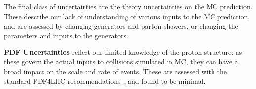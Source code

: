 	The final class of uncertainties are the theory uncertainties on the MC prediction. These describe our lack of understanding of various inputs to the MC prediction, and are assessed by changing generators and parton showers, or changing the parameters and inputs to the generators.


	\textbf{PDF Uncertainties} reflect our limited knowledge of the proton structure: as these govern the actual inputs to collisions simulated in MC, they can have a broad impact on the scale and rate of events. These are assessed with the standard PDF4LHC recommendations~\cite{Botje:2011sn}, and found to be minimal. %




